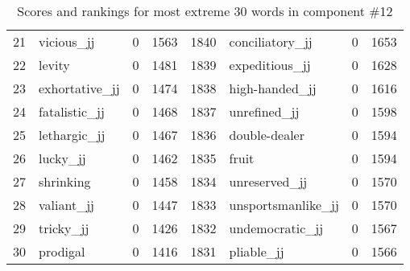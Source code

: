 \begin{table}[tbp]
\begin{tabular}{| rlr@{.}l | rlr@{.}l |}
    21 & vicious\_jj & 0 & 1563    &    1840 & conciliatory\_jj & 0 & 1653 \\
    22 & levity & 0 & 1481    &    1839 & expeditious\_jj & 0 & 1628 \\
    23 & exhortative\_jj & 0 & 1474    &    1838 & high-handed\_jj & 0 & 1616 \\
    24 & fatalistic\_jj & 0 & 1468    &    1837 & unrefined\_jj & 0 & 1598 \\
    25 & lethargic\_jj & 0 & 1467    &    1836 & double-dealer & 0 & 1594 \\
    26 & lucky\_jj & 0 & 1462    &    1835 & fruit & 0 & 1594 \\
    27 & shrinking & 0 & 1458    &    1834 & unreserved\_jj & 0 & 1570 \\
    28 & valiant\_jj & 0 & 1447    &    1833 & unsportsmanlike\_jj & 0 & 1570 \\
    29 & tricky\_jj & 0 & 1426    &    1832 & undemocratic\_jj & 0 & 1567 \\
    30 & prodigal & 0 & 1416    &    1831 & pliable\_jj & 0 & 1566 \\
    \hline
    \end{tabular}
    \caption{Scores and rankings for most extreme 30 words in component \#12} 
\end{table}
\clearpage
